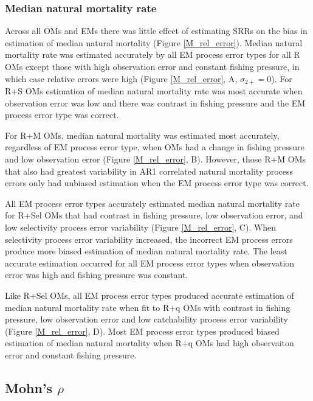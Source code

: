 \documentclass[
  12pt,
]{article}
\begin{document}
\subsubsection*{Median natural mortality
rate}\label{median-natural-mortality-rate}

Across all OMs and EMs there was little effect of estimating SRRs on the
bias in estimation of median natural mortality (Figure
\ref{M_rel_error}). Median natural mortality rate was estimated
accurately by all EM process error types for all R OMs except those with
high observation error and constant fishing pressure, in which case
relative errors were high (Figure \ref{M_rel_error}, A,
\(\sigma_{2+} = 0\)). For R+S OMs estimation of median natural mortality
rate was most accurate when observation error was low and there was
contrast in fishing pressure and the EM process error type was correct.

For R+M OMs, median natural mortality was estimated most accurately,
regardless of EM process error type, when OMs had a change in fishing
pressure and low observation error (Figure \ref{M_rel_error}, B).
However, those R+M OMs that also had greatest variability in AR1
correlated natural mortality process errors only had unbiased estimation
when the EM process error type was correct.

All EM process error types accurately estimated median natural mortality
rate for R+Sel OMs that had contrast in fishing pressure, low
observation error, and low selectivity process error variability (Figure
\ref{M_rel_error}, C). When selectivity process error variability
increased, the incorrect EM process errors produce more biased
estimation of median natural mortality rate. The least accurate
estimation occurred for all EM process error types when observation
error was high and fishing pressure was constant.

Like R+Sel OMs, all EM process error types produced accurate estimation
of median natural mortality rate when fit to R+q OMs with contrast in
fishing pressure, low observation error and low catchability process
error variability (Figure \ref{M_rel_error}, D). Most EM process error
types produced biased estimation of median natural mortality when R+q
OMs had high observaiton error and constant fishing pressure.

\subsection*{\texorpdfstring{Mohn's
\(\rho\)}{Mohn's \textbackslash rho}}\label{mohns-rho-1}
\end{document}
